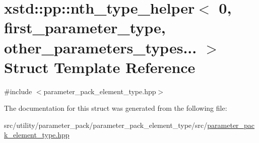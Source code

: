 \hypertarget{structxstd_1_1pp_1_1nth__type__helper_3_010_00_01first__parameter__type_00_01other__parameters__types_8_8_8_01_4}{\section{xstd\-:\-:pp\-:\-:nth\-\_\-type\-\_\-helper$<$ 0, first\-\_\-parameter\-\_\-type, other\-\_\-parameters\-\_\-types... $>$ Struct Template Reference}
\label{structxstd_1_1pp_1_1nth__type__helper_3_010_00_01first__parameter__type_00_01other__parameters__types_8_8_8_01_4}
}


{\ttfamily \#include $<$parameter\-\_\-pack\-\_\-element\-\_\-type.\-hpp$>$}



The documentation for this struct was generated from the following file\-:\begin{DoxyCompactItemize}
\item 
src/utility/parameter\-\_\-pack/parameter\-\_\-pack\-\_\-element\-\_\-type/src/\hyperlink{parameter__pack__element__type_8hpp}{parameter\-\_\-pack\-\_\-element\-\_\-type.\-hpp}\end{DoxyCompactItemize}
